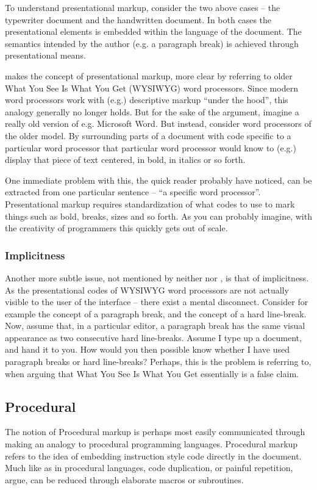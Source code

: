 \documentclass{scrreprt}
\begin{document}
To understand presentational markup, consider the two above cases -- the typewriter document and the handwritten document. In both cases the presentational elements is embedded within the language of the document. The semantics intended by the author (e.g. a paragraph break) is achieved through presentational means.

\citet{bray} makes the concept of presentational markup, more clear by referring to older What You See Is What You Get (WYSIWYG) word processors. Since modern word processors work with (e.g.) descriptive markup ``under the hood'', this analogy generally no longer holds. But for the sake of the argument, imagine a really old version of e.g. Microsoft Word. But instead, consider word processors of the older model. By surrounding parts of a document with code specific to a particular word processor that particular word processor would know to (e.g.) display that piece of text centered, in bold, in italics or so forth.

One immediate problem with this, the quick reader probably have noticed, can be extracted from one particular sentence -- ``a specific word processor''. Presentational markup requires standardization of what codes to use to mark things such as bold, breaks, sizes and so forth. As you can probably imagine, with the creativity of programmers this quickly gets out of scale.

\subsubsection{Implicitness}
Another more subtle issue, not mentioned by neither \citet{coombs} nor \citet{bray}, is that of implicitness. As the presentational codes of WYSIWYG word processors are not actually visible to the user of the interface -- there exist a mental disconnect. Consider for example the concept of a paragraph break, and the concept of a hard line-break. Now, assume that, in a particular editor, a paragraph break has the same visual appearance as two consecutive hard line-breaks. Assume I type up a document, and hand it to you. How would you then possible know whether I have used paragraph breaks or hard line-breaks? Perhaps, this is the problem \citet{bray} is referring to, when arguing that What You See Is What You Get essentially is a false claim.



\subsection{Procedural}
The notion of Procedural markup is perhaps most easily communicated through making an analogy to procedural programming languages. Procedural markup refers to the idea of embedding instruction style code directly in the document. Much like as in procedural languages, code duplication, or painful repetition, \citet{bray} argue, can be reduced through elaborate macros or subroutines.
\end{document}

